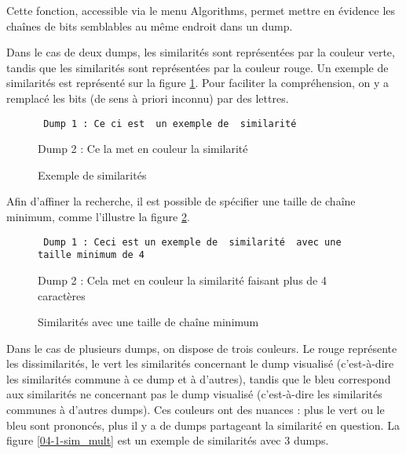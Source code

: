 Cette fonction, accessible via le menu Algorithms, permet mettre en évidence les chaînes de bits semblables au même endroit dans un dump.

Dans le cas de deux dumps, les similarités sont représentées par la couleur verte, tandis que les similarités sont représentées par la couleur rouge. Un exemple de similarités est représenté sur la figure \ref{04-1-sim_simple}. Pour faciliter la compréhension, on y a remplacé les bits (de sens à priori inconnu) par des lettres.

\begin{figure}[!h]
  \begin{center}
  {\tt\center
  {Dump 1 : \color{simColor} Ce}{\color{dissimColor} ci es}{\color{simColor}t }{\color{dissimColor} un exemple de }{\color{simColor} similarité}

  {Dump 2 : \color{simColor} Ce}{\color{dissimColor} la me}{\color{simColor}t }{\color{dissimColor} en couleur la }{\color{simColor} similarité}
  }
  \end{center}
  \caption{Exemple de similarités}
  \label{04-1-sim_simple}
\end{figure}

Afin d'affiner la recherche, il est possible de spécifier une taille de chaîne minimum, comme l'illustre la figure \ref{04-1-sim_taille_min}.

\begin{figure}[!h]
  \begin{center}
  {\tt
  {Dump 1 : \color{dissimColor} Ceci est un exemple de }{\color{simColor} similarité }{\color{dissimColor} avec une taille minimum de 4}

  {Dump 2 : \color{dissimColor} Cela met en couleur la }{\color{simColor} similarité }{\color{dissimColor} faisant plus de 4 caractères}
  }
  \end{center}
  \caption{Similarités avec une taille de chaîne minimum}
  \label{04-1-sim_taille_min}
\end{figure}


Dans le cas de plusieurs dumps, on dispose de trois couleurs. Le rouge représente les dissimilarités, le vert les similarités concernant le dump visualisé (c'est-à-dire les similarités commune à ce dump et à d'autres), tandis que le bleu correspond aux similarités ne concernant pas le dump visualisé (c'est-à-dire les similarités communes à d'autres dumps).
Ces couleurs ont des nuances : plus le vert ou le bleu sont prononcés, plus il y a de dumps partageant la similarité en question. La figure \ref{04-1-sim_mult} est un exemple de similarités avec 3 dumps.

